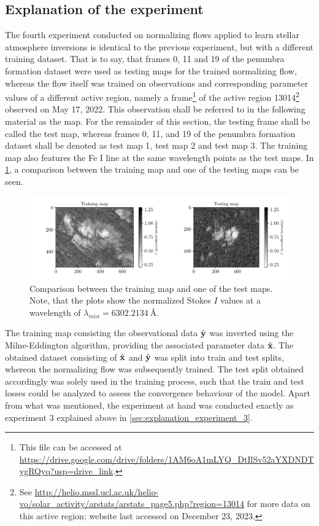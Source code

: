 \documentclass[a4paper,12pt]{report}
\def\lk#1{{\color{black}{#1}}}
\begin{document}
\subsection{Explanation of the experiment}
The fourth experiment conducted on normalizing flows applied to learn stellar atmosphere inversions is identical to the previous experiment, but with a different training dataset. That is to say, that frames 0, 11 and 19 of the penumbra formation dataset were used as testing maps for the trained normalizing flow, whereas the flow itself was trained on observations and corresponding parameter values of a different active region, namely a frame\footnote{This file can be accessed at \url{https://drive.google.com/drive/folders/1AM6oA1mLYQ_DtIlSv52aYXDNDTygRQyq?usp=drive_link}.} of the active region 13014\footnote{See \url{http://helio.mssl.ucl.ac.uk/helio-vo/solar_activity/arstats/arstats_page5.php?region=13014} for more data on this active region; website last accessed on December 23, 2023.} observed on May 17, 2022. This observation shall be referred to in the following material as the \lk{sunspot} map. For the remainder of this section, the testing frame shall be called the test map, whereas frames 0, 11, and 19 of the penumbra formation dataset shall be denoted as test map 1, test map 2 and test map 3. The training map also features the Fe I line at the same wavelength points as the test maps. In \cref{fig:nf-milne-eddington-example-4-trainingmap-testingmap-nflows-piecewisequadratic}, a comparison between the training map and one of the testing maps can be seen.
\begin{figure}[h!]
\centering
\includegraphics[width=\textwidth]{figures/nf-milne-eddington-example-4-trainingmap-testingmap-nflows-piecewisequadratic.pdf}
\caption{Comparison between the training map and one of the test maps. Note, that the plots show the normalized Stokes $I$ values at a wavelength of $\lambda_{min} = \SI{6302.2134}{\angstrom}$.}
\label{fig:nf-milne-eddington-example-4-trainingmap-testingmap-nflows-piecewisequadratic}
\end{figure}
The training map consisting the observational data $\hat{\boldsymbol{\mathbf{y}}}$ was inverted using the Milne-Eddington algorithm, providing the associated parameter data $\hat{\boldsymbol{\mathbf{x}}}$. The obtained dataset consisting of $\hat{\boldsymbol{\mathbf{x}}}$ and $\hat{\boldsymbol{\mathbf{y}}}$ was split into train and test splits, whereon the normalizing flow was subsequently trained. The test split obtained accordingly was solely used in the training process, such that the train and test losses could be analyzed to assess the convergence behaviour of the model. Apart from what was mentioned, the experiment at hand was conducted exactly as experiment 3 explained above in \cref{sec:explanation_experiment_3}.
\end{document}
